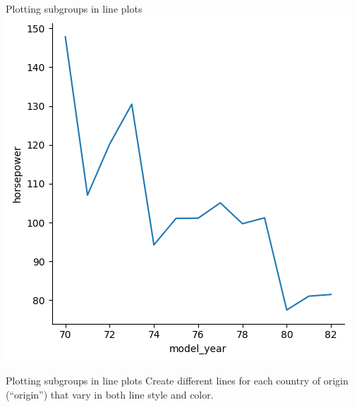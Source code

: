 \documentclass[
  ignorenonframetext,
]{beamer}
\newenvironment{Shaded}{\begin{snugshade}}{\end{snugshade}}
\begin{document}
\begin{frame}{Plotting subgroups in line plots}
\label{plotting-subgroups-in-line-plots-2}
\includegraphics{../images/im273.png}
\end{frame}

\begin{frame}[fragile]{Plotting subgroups in line plots}
\label{plotting-subgroups-in-line-plots-3}
Create different lines for each country of origin (``origin'') that vary
in both line style and color.


\begin{Shaded}
\begin{Highlighting}[]

\end{Highlighting}
\end{Shaded}
\end{frame}
\end{document}
